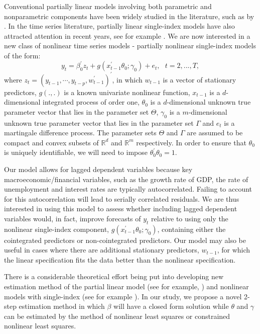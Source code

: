 \documentclass[a4paper,12pt,times,numbered,print,index]{report}
\numberwithin{equation}{section}
\begin{document}
Conventional partially linear models involving both parametric and nonparametric components have been widely studied in the literature, such as by \cite{gao2007nonlinear}. In the time series literature, partially linear single-index models have also attracted attention in recent years, see for example \cite{dong2016estimation}. We are now interested in a new class of nonlinear time series models - partially nonlinear single-index models of the form:
\begin{equation}
y_{t} = \beta_0^{\prime} z_t + g\left( x_{t-1}^{\prime }\theta_0; \gamma_0\right) +e_{t},\ \ \
t=2,...,T,  \label{PL model}
\end{equation}%
where $z_t = (y_{t-1}, \cdots, y_{t-p}, w_{t-1}^{\prime})^{\prime}$, in which $w_{t-1}$ is a vector of stationary predictors, 
$g\left( .,.\right) $ is a known univariate nonlinear function, $x_{t-1}$ is a $d$-dimensional integrated process of order one, $\theta _{0}$ is a $d$-dimensional unknown true parameter vector that lies in the parameter set $\Theta $, $\gamma _{0}$ is a $m$-dimensional unknown true parameter vector that lies in the parameter set $\Gamma $ and $e_{t}$ is a martingale
difference process. The parameter sets $\Theta $ and $\Gamma $ are assumed to be compact and convex subsets of $\mathbb{R}^{d}$ and $\mathbb{R}^{m}$ respectively. In order to ensure that $\theta_0$ is uniquely identifiable, we will need to impose $\theta_{0}^{\prime}\theta_{0} = 1$.

Our model allows for lagged dependent variables because key macroeconomic/financial variables, such as the growth rate of GDP, the rate of unemployment and interest rates are typically autocorrelated. Failing to account for this autocorrelation will lead to serially correlated residuals. We are thus interested in using this model to assess whether including lagged dependent variables would, in fact, improve forecasts of $y_{t}$ relative to using only the nonlinear single-index component, $g\left( x_{t-1}^{\prime }\theta_0; \gamma_0\right)$, containing either the cointegrated predictors or non-cointegrated predictors. Our model may also be useful in cases where there are additional stationary predictors, $w_{t-1}$, for which the linear specification fits the data better than the nonlinear specification.

There is a considerable theoretical effort being put into developing new estimation method of the partial linear model (see for example, \cite{dong2016estimation}) and nonlinear models with single-index (see for example \cite{chang2003index}). In our study, we propose a novel 2-step estimation method in which $\beta$ will have a closed form solution while $\theta$ and $\gamma$ can be estimated by the method of nonlinear least squares or constrained nonlinear least squares.
\end{document}
